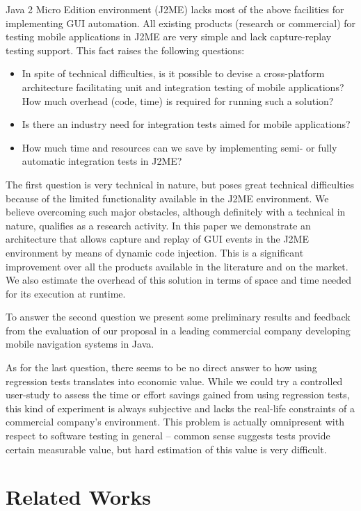 \documentclass{llncs}
\newcommand{\customtextsc}[1]{{\scriptsize \MakeUppercase{#1}}}
\newcommand{\acro}[1]{\customtextsc{#1}}   %
\newcommand{\gui}{\acro{gui}}              %
\newcommand{\jme}{\acro{j2me}}             %
\begin{document}
Java 2 Micro Edition environment (\jme{}) lacks most of the above facilities for implementing \gui{}
automation. All existing products (research or commercial) for testing mobile applications in \jme{}
are very simple and lack capture-replay testing support. This fact raises the following questions:
%
\begin{itemize}
    \item In spite of technical difficulties, is it possible to devise a cross-platform architecture 
	facilitating unit and integration testing of mobile applications? How much overhead (code, time) 
	is required for running such a solution?
    \item Is there an industry need for integration tests aimed for mobile applications?
    \item How much time and resources can we save by implementing semi- or fully automatic
    integration tests in \jme{}?
\end{itemize}
%
The first question is very technical in nature, but poses great technical difficulties because
of the limited functionality available in the \jme{} environment. We believe overcoming such major
obstacles, although definitely with a technical in nature, qualifies as a research activity. In this paper we
demonstrate an architecture that allows capture and replay of \gui{} events in the \jme{} environment
by means of dynamic code injection. This is a significant improvement over all the products available 
in the literature and on the market. We also estimate the overhead of this solution in terms of space 
and time needed for its execution at runtime.

To answer the second question we present some preliminary results and feedback from the
evaluation of our proposal in a leading commercial company developing mobile navigation systems in
Java.

As for the last question, there seems to be no direct answer to how using regression tests
translates into economic value. While we could try a controlled user-study to assess the time or effort 
savings gained from using regression tests, this kind of experiment is always subjective 
and lacks the real-life constraints of a commercial company's environment. This problem is 
actually omnipresent with respect to software testing in general -- common sense suggests tests provide 
certain measurable value, but hard estimation of this value is very difficult.

\section{Related Works} %
\end{document}
